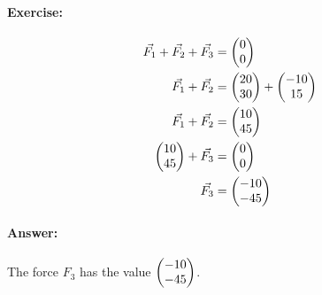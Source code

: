 \paragraph{Exercise:}
\begin{align}
    \vec{F_1} + \vec{F_2} + \vec{F_3} &= \begin{pmatrix}
        0 \\
        0
    \end{pmatrix} \\
    \vec{F_1} + \vec{F_2} &= \begin{pmatrix} 20 \\ 30 \end{pmatrix} + \begin{pmatrix} -10 \\ 15 \end{pmatrix} \\
    \vec{F_1} + \vec{F_2} &= \begin{pmatrix} 10 \\ 45 \end{pmatrix} \\
    \begin{pmatrix} 10 \\ 45 \end{pmatrix} + \vec{F_3} &= \begin{pmatrix}
        0 \\
        0
    \end{pmatrix} \\
    \vec{F_3} &= \begin{pmatrix} -10 \\ -45 \end{pmatrix}
\end{align}

\paragraph{Answer:}
The force $F_3$ has the value $\begin{pmatrix} -10 \\ -45 \end{pmatrix}$.
